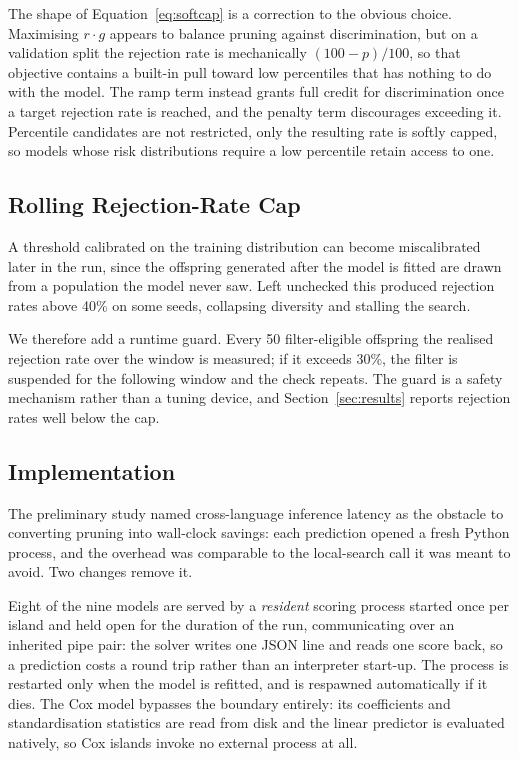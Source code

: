 \documentclass[a4paper,fleqn]{cas-dc}
\begin{document}
The shape of Equation~\eqref{eq:softcap} is a correction to the obvious choice.
Maximising $r \cdot g$ appears to balance pruning against discrimination, but on
a validation split the rejection rate is mechanically $(100 - p)/100$, so that
objective contains a built-in pull toward low percentiles that has nothing to do
with the model. The ramp term instead grants full credit for discrimination once
a target rejection rate is reached, and the penalty term discourages exceeding
it. Percentile candidates are not restricted, only the resulting rate is softly
capped, so models whose risk distributions require a low percentile retain
access to one.

\subsection{Rolling Rejection-Rate Cap}\label{sec:fw-cap}

A threshold calibrated on the training distribution can become miscalibrated
later in the run, since the offspring generated after the model is fitted are
drawn from a population the model never saw. Left unchecked this produced
rejection rates above 40\% on some seeds, collapsing diversity and stalling the
search.

We therefore add a runtime guard. Every 50 filter-eligible offspring the
realised rejection rate over the window is measured; if it exceeds 30\%, the
filter is suspended for the following window and the check repeats. The guard is
a safety mechanism rather than a tuning device, and Section~\ref{sec:results}
reports rejection rates well below the cap.

\subsection{Implementation}\label{sec:fw-impl}

The preliminary study named cross-language inference latency as the obstacle to
converting pruning into wall-clock savings: each prediction opened a fresh Python
process, and the overhead was comparable to the local-search call it was meant to
avoid. Two changes remove it.

Eight of the nine models are served by a \emph{resident} scoring process started
once per island and held open for the duration of the run, communicating over an
inherited pipe pair: the solver writes one JSON line and reads one score back,
so a prediction costs a round trip rather than an interpreter start-up. The
process is restarted only when the model is refitted, and is respawned
automatically if it dies. The Cox model bypasses the boundary entirely: its
coefficients and standardisation statistics are read from disk and the linear
predictor is evaluated natively, so Cox islands invoke no external process at
all.
\end{document}
